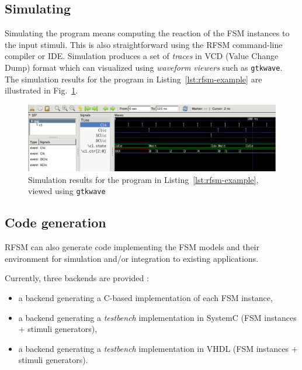 
  
\subsection*{Simulating}
\label{sec:simulating-1}

Simulating the program means computing the reaction of the FSM instances to the input stimuli. This
is also straightforward using the RFSM command-line compiler or IDE. Simulation produces a set of
\emph{traces} in VCD (Value Change Dump) format which can visualized using \emph{waveform viewers}
such as \texttt{gtkwave}. The simulation results for the program in Listing~\ref{lst:rfsm-example}
are illustrated in Fig.~\ref{fig:rfsm-example-vcd}.

\begin{figure}[h]
   \includegraphics[width=\textwidth]{figs/ctlsouris-chrono}
   \centering
  \caption{Simulation results for the program in Listing~\ref{lst:rfsm-example}, viewed using
    \texttt{gtkwave}}
  \label{fig:rfsm-example-vcd}
\end{figure}

\subsection*{Code generation}
\label{sec:code-generation-1}

RFSM can also generate code implementing the FSM models and their environment for simulation and/or
integration to existing applications.

\medskip
Currently, three backends are provided :
\begin{itemize}
\item a backend generating a C-based implementation of each FSM instance,
\item a backend generating a \emph{testbench} implementation in SystemC (FSM instances + stimuli
  generators),
\item a backend generating a \emph{testbench} implementation in VHDL (FSM instances + stimuli
  generators).
\end{itemize}

